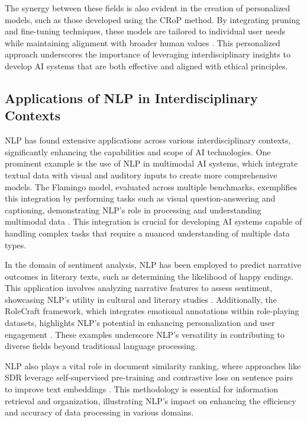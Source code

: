 The synergy between these fields is also evident in the creation of personalized models, such as those developed using the CRoP method. By integrating pruning and fine-tuning techniques, these models are tailored to individual user needs while maintaining alignment with broader human values \cite{kaur2024cropcontextwiserobuststatic}. This personalized approach underscores the importance of leveraging interdisciplinary insights to develop AI systems that are both effective and aligned with ethical principles.





\subsection{Applications of NLP in Interdisciplinary Contexts} \label{subsec:Applications of NLP in Interdisciplinary Contexts}

NLP has found extensive applications across various interdisciplinary contexts, significantly enhancing the capabilities and scope of AI technologies. One prominent example is the use of NLP in multimodal AI systems, which integrate textual data with visual and auditory inputs to create more comprehensive models. The Flamingo model, evaluated across multiple benchmarks, exemplifies this integration by performing tasks such as visual question-answering and captioning, demonstrating NLP's role in processing and understanding multimodal data \cite{alayrac2022flamingo}. This integration is crucial for developing AI systems capable of handling complex tasks that require a nuanced understanding of multiple data types.



In the domain of sentiment analysis, NLP has been employed to predict narrative outcomes in literary texts, such as determining the likelihood of happy endings. This application involves analyzing narrative features to assess sentiment, showcasing NLP's utility in cultural and literary studies \cite{jannidis2016analyzingfeaturesdetectionhappy}. Additionally, the RoleCraft framework, which integrates emotional annotations within role-playing datasets, highlights NLP's potential in enhancing personalization and user engagement \cite{tao2024rolecraftglmadvancingpersonalizedroleplaying}. These examples underscore NLP's versatility in contributing to diverse fields beyond traditional language processing.



NLP also plays a vital role in document similarity ranking, where approaches like SDR leverage self-supervised pre-training and contrastive loss on sentence pairs to improve text embeddings \cite{ginzburg2021selfsuperviseddocumentsimilarityranking}. This methodology is essential for information retrieval and organization, illustrating NLP's impact on enhancing the efficiency and accuracy of data processing in various domains.



